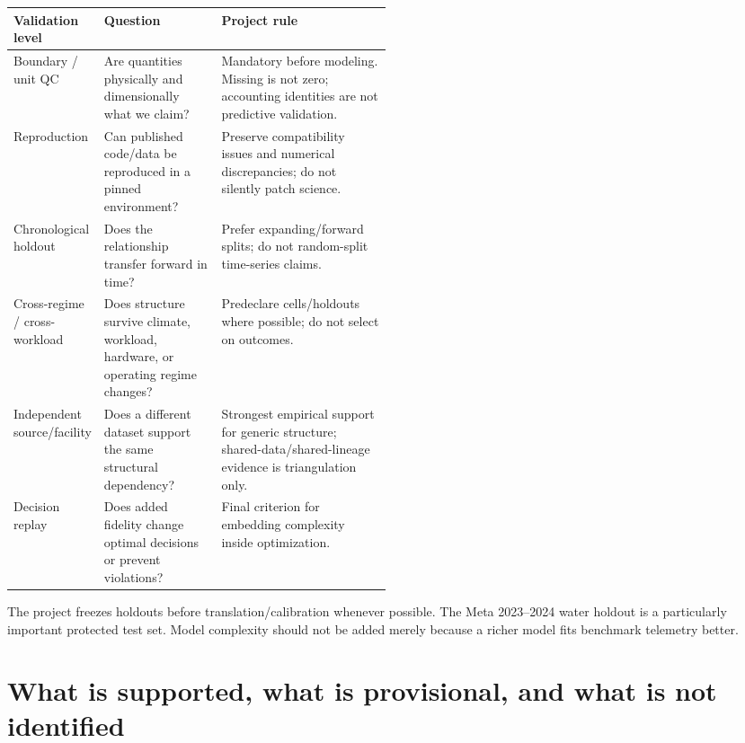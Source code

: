\documentclass[11pt]{article}
\begin{document}
\begin{center}
\small
\begin{tabularx}{0.97\linewidth}{@{}p{0.18\linewidth}p{0.31\linewidth}Y@{}}
\toprule
\textbf{Validation level} & \textbf{Question} & \textbf{Project rule} \\
\midrule
Boundary / unit QC & Are quantities physically and dimensionally what we claim? & Mandatory before modeling. Missing is not zero; accounting identities are not predictive validation. \\
Reproduction & Can published code/data be reproduced in a pinned environment? & Preserve compatibility issues and numerical discrepancies; do not silently patch science. \\
Chronological holdout & Does the relationship transfer forward in time? & Prefer expanding/forward splits; do not random-split time-series claims. \\
Cross-regime / cross-workload & Does structure survive climate, workload, hardware, or operating regime changes? & Predeclare cells/holdouts where possible; do not select on outcomes. \\
Independent source/facility & Does a different dataset support the same structural dependency? & Strongest empirical support for generic structure; shared-data/shared-lineage evidence is triangulation only. \\
Decision replay & Does added fidelity change optimal decisions or prevent violations? & Final criterion for embedding complexity inside optimization. \\
\bottomrule
\end{tabularx}
\end{center}

The project freezes holdouts before translation/calibration whenever possible. The Meta 2023--2024 water holdout is a particularly important protected test set. Model complexity should not be added merely because a richer model fits benchmark telemetry better.

\section{What is supported, what is provisional, and what is not identified}
\end{document}
